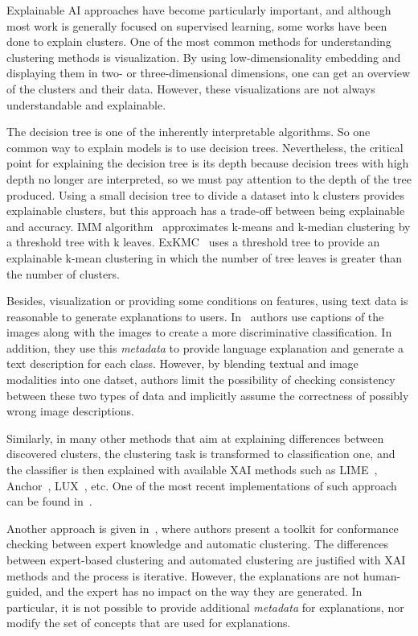 \documentclass{article}
\begin{document}
Explainable AI approaches have become particularly important, and although most work is generally focused on supervised learning, some works have been done to explain clusters.
One of the most common methods for understanding clustering methods is visualization.
By using low-dimensionality embedding and displaying them in two- or three-dimensional dimensions, one can get an overview of the clusters and their data.
However, these visualizations are not always understandable and explainable.

The decision tree is one of the inherently interpretable algorithms.
So one common way to explain models is to use decision trees.
Nevertheless, the critical point for explaining the decision tree is its depth because decision trees with high depth no longer are interpreted, so we must pay attention to the depth of the tree produced.
Using a small decision tree to divide a dataset into k clusters provides explainable clusters, but this approach has a trade-off between being explainable and accuracy.
IMM algorithm~\cite{dasgupta2020explainable} approximates k-means and k-median clustering by a threshold tree with k leaves.
ExKMC~\cite{frost2020exkmc} uses a threshold tree to provide an explainable k-mean clustering in which the number of tree leaves is greater than the number of clusters.

Besides, visualization or providing some conditions on features, using text data is reasonable to generate explanations to users.
In~\cite{hendricks2016generating} authors use captions of the images along with the images to create a more discriminative classification.
In addition, they use this \textit{metadata} to provide language explanation and generate a text description for each class.
However, by blending textual and image modalities into one datset, authors limit the possibility of checking consistency between these two types of data and implicitly assume the correctness of possibly wrong image descriptions.

Similarly, in many other methods that aim at explaining differences between discovered clusters, the clustering task is transformed to classification one, and the classifier is then explained with available XAI methods such as LIME~\cite{lime}, Anchor~\cite{anchor}, LUX~\cite{lux2021iccs}, etc.
One of the most recent implementations of such approach can be found in~\cite{xaiclust2021}.

Another approach is given in~\cite{knac2021arxiv}, where authors present a toolkit for conformance checking between expert knowledge and automatic clustering.
The differences between expert-based clustering and automated clustering are justified with XAI methods and the process is iterative.
However, the explanations are not human-guided, and the expert has no impact on the way they are generated.
In particular, it is not possible to provide additional \textit{metadata} for explanations, nor modify the set of concepts that are used for explanations.
\end{document}
